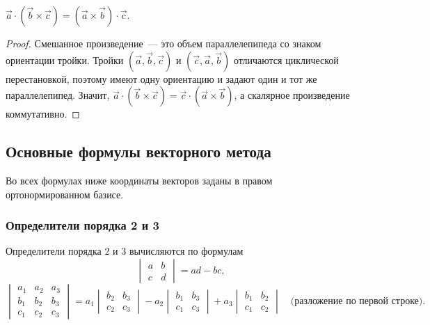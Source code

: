 \documentclass[12pt]{article}
\begin{document}
    \begin{statement}
    	$\vec{a} \cdot \left( \vec{b} \times \vec{c} \right) = \left( \vec{a} \times \vec{b} \right) \cdot \vec{c}$.
    \end{statement}
    
    \begin{proof}
    	Смешанное произведение~--- это объем параллелепипеда со знаком ориентации тройки. Тройки $(\vec{a}, \vec{b}, \vec{c})$ и $(\vec{c}, \vec{a}, \vec{b})$ отличаются циклической перестановкой, поэтому имеют одну ориентацию и задают один и тот же параллелепипед. Значит, $\vec{a} \cdot (\vec{b} \times \vec{c}) = \vec{c} \cdot (\vec{a} \times \vec{b})$, а скалярное произведение коммутативно.
    \end{proof}

	\subsection{Основные формулы векторного метода}
    
    \begin{note}
    	Во всех формулах ниже координаты векторов заданы в правом ортонормированном базисе.
    \end{note}
    
    \subsubsection{Определители порядка 2 и 3}
    
    \begin{definition}[Определитель]
    	Определители порядка $2$ и $3$ вычисляются по формулам
    	\[
    		\begin{vmatrix}
    			a & b \\
    			c & d
    		\end{vmatrix} = ad - bc,
    	\]
    	\[
    		\begin{vmatrix}
    			a_1 & a_2 & a_3 \\
    			b_1 & b_2 & b_3 \\
    			c_1 & c_2 & c_3
    		\end{vmatrix}
    		= a_1 \begin{vmatrix} b_2 & b_3 \\ c_2 & c_3 \end{vmatrix}
    		- a_2 \begin{vmatrix} b_1 & b_3 \\ c_1 & c_3 \end{vmatrix}
    		+ a_3 \begin{vmatrix} b_1 & b_2 \\ c_1 & c_2 \end{vmatrix}
    		\quad \text{(разложение по первой строке).}
    	\]
    \end{definition}
    
\end{document}
